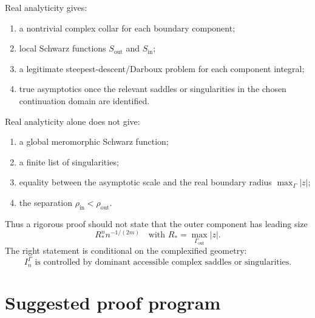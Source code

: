 \documentclass[11pt]{article}
\newcommand{\1}{\mathbf 1}
\begin{document}
Real analyticity gives:
\begin{enumerate}[label=(\roman*)]
\item a nontrivial complex collar for each boundary component;
\item local Schwarz functions \(S_{\mathrm{out}}\) and \(S_{\mathrm{in}}\);
\item a legitimate steepest-descent/Darboux problem for each component integral;
\item true asymptotics once the relevant saddles or singularities in the chosen
continuation domain are identified.
\end{enumerate}

Real analyticity alone does not give:
\begin{enumerate}[label=(\roman*)]
\item a global meromorphic Schwarz function;
\item a finite list of singularities;
\item equality between the asymptotic scale and the real boundary radius
\(\max_\Gamma |z|\);
\item the separation \(\rho_{\mathrm{in}}<\rho_{\mathrm{out}}\).
\end{enumerate}

Thus a rigorous proof should not state that the outer component has leading size
\[
  R_*^n n^{-1/(2m)}
  \quad\text{with } R_*=\max_{\Gamma_{\mathrm{out}}}|z|.
\]
The right statement is conditional on the complexified geometry:
\[
  I_n^\Gamma
  \text{ is controlled by dominant accessible complex saddles or singularities.}
\]

\section{Suggested proof program}
\end{document}
